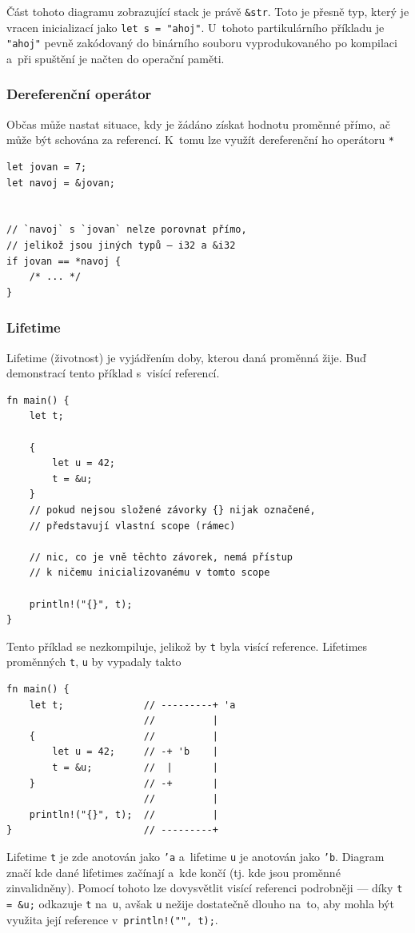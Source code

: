 \documentclass[a4paper, 12pt, twoside]{article} %
\newcommand{\rust}[1]{\texttt{#1}}
\begin{document}
				Část tohoto diagramu zobrazující stack je právě \rust{&str}. Toto je přesně typ, který je vracen inicializací jako \rust{let s = "ahoj"}. U~tohoto partikulárního příkladu je \rust{"ahoj"} pevně zakódovaný do binárního souboru vyprodukovaného po kompilaci a~při spuštění je načten do operační paměti.

			\subsubsection*{Dereferenční operátor}
				Občas může nastat situace, kdy je žádáno získat hodnotu proměnné přímo, ač může být schována za referencí. K~tomu lze využít dereferenční ho operátoru \rust{*}
				\begin{verbatim} 
let jovan = 7;
let navoj = &jovan;


// `navoj` s `jovan` nelze porovnat přímo,
// jelikož jsou jiných typů — i32 a &i32
if jovan == *navoj {
	/* ... */
}
				\end{verbatim}
		
			\subsubsection*{Lifetime}
				Lifetime (životnost) je vyjádřením doby, kterou daná proměnná žije. Buď demonstrací tento příklad s~visící referencí.
				\begin{verbatim}
fn main() {
	let t;

	{
		let u = 42;
		t = &u;
	}
	// pokud nejsou složené závorky {} nijak označené,
	// představují vlastní scope (rámec)

	// nic, co je vně těchto závorek, nemá přístup
	// k ničemu inicializovanému v tomto scope

	println!("{}", t);
}
				\end{verbatim}
				
				Tento příklad se nezkompiluje, jelikož by \rust{t} byla visící reference. Lifetimes proměnných \rust{t}, \rust{u} by vypadaly takto
				\begin{verbatim}
fn main() {
	let t;              // ---------+ 'a
						//          |
	{                   //          |
		let u = 42;     // -+ 'b    |
		t = &u;         //  |       |
	}                   // -+       |
						//          |
	println!("{}", t);  //          |
}                       // ---------+
			\end{verbatim}
			
				Lifetime \rust{t} je zde anotován jako \rust{'a} a~lifetime \rust{u} je anotován jako \rust{'b}. Diagram značí kde dané lifetimes začínají a~kde končí (tj. kde jsou proměnné zinvalidněny). Pomocí tohoto lze dovysvětlit visící referenci podrobněji — díky \rust{t = &u;} odkazuje \rust{t} na~\rust{u}, avšak \rust{u} nežije dostatečně dlouho na~to, aby mohla být využita její reference v~\rust{println!("{}", t);}.
				
\end{document}
